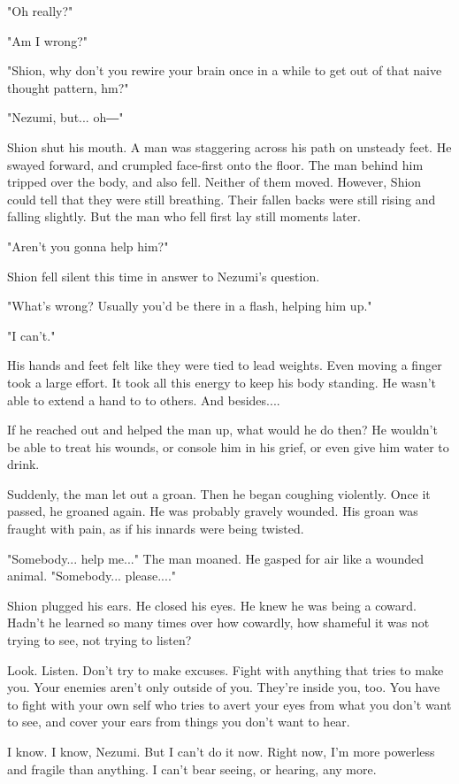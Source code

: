 "Oh really?"

"Am I wrong?"

"Shion, why don't you rewire your brain once in a while to get out of
that naive thought pattern, hm?"

"Nezumi, but... oh―"

Shion shut his mouth. A man was staggering across his path on unsteady
feet. He swayed forward, and crumpled face-first onto the floor. The man
behind him tripped over the body, and also fell. Neither of them moved.
However, Shion could tell that they were still breathing. Their fallen
backs were still rising and falling slightly. But the man who fell first
lay still moments later.

"Aren't you gonna help him?"

Shion fell silent this time in answer to Nezumi's question.

"What's wrong? Usually you'd be there in a flash, helping him up."

"I can't."

His hands and feet felt like they were tied to lead weights. Even moving
a finger took a large effort. It took all this energy to keep his body
standing. He wasn't able to extend a hand to to others. And besides....

If he reached out and helped the man up, what would he do then? He
wouldn't be able to treat his wounds, or console him in his grief, or
even give him water to drink.

Suddenly, the man let out a groan. Then he began coughing violently.
Once it passed, he groaned again. He was probably gravely wounded. His
groan was fraught with pain, as if his innards were being twisted.

"Somebody... help me..." The man moaned. He gasped for air like a
wounded animal. "Somebody... please...."

Shion plugged his ears. He closed his eyes. He knew he was being a
coward. Hadn't he learned so many times over how cowardly, how shameful
it was not trying to see, not trying to listen?

Look. Listen. Don't try to make excuses. Fight with anything that tries
to make you. Your enemies aren't only outside of you. They're inside
you, too. You have to fight with your own self who tries to avert your
eyes from what you don't want to see, and cover your ears from things
you don't want to hear.

I know. I know, Nezumi. But I can't do it now. Right now, I'm more
powerless and fragile than anything. I can't bear seeing, or hearing,
any more.


